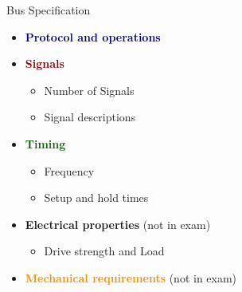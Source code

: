 \begin{concept}{Bus Specification}
    \begin{itemize}
        \item \textcolor{darkblue}{\textbf{Protocol and operations}}
        \item \textcolor{darkred}{\textbf{Signals}}
        \begin{itemize}
            \item Number of Signals
            \item Signal descriptions
        \end{itemize}
        \item \textcolor{darkgreen}{\textbf{Timing}}
        \begin{itemize}
            \item Frequency
            \item Setup and hold times
        \end{itemize}
        \item \textcolor{darkpurple}{\textbf{Electrical properties}} (not in exam)
        \begin{itemize}
            \item Drive strength and Load
        \end{itemize}
        \item \textcolor{darkorange}{\textbf{Mechanical requirements}} (not in exam)
    \end{itemize}
\end{concept}


